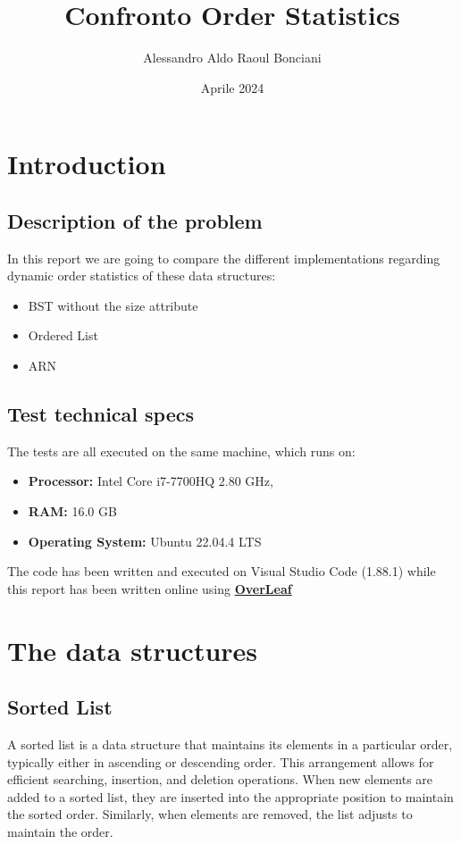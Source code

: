 \documentclass[11pt]{article}
\title{Confronto Order Statistics}
\author{Alessandro Aldo Raoul Bonciani}
\date{Aprile 2024}
\begin{document}

\maketitle
\tableofcontents


\newpage
\section{Introduction}
\subsection{Description of the problem}
In this report we are going to compare the different implementations regarding dynamic order statistics of these data structures:
\begin{itemize}
    \item BST without the size attribute
    \item Ordered List
    \item ARN
\end{itemize}
\subsection{Test technical specs}
The tests are all executed on the same machine, which runs on:\begin{itemize}
    \item \textbf{Processor:} Intel Core i7-7700HQ 2.80 GHz,
    \item \textbf{RAM:} 16.0 GB
    \item \textbf{Operating System:} Ubuntu 22.04.4 LTS
\end{itemize}
The code has been written and executed on Visual Studio Code (1.88.1) while this report has been written online using \textbf{\href{https://overleaf.com}{OverLeaf}}
\section{The data structures}
\subsection{Sorted List}
A sorted list is a data structure that maintains its elements in a particular order, typically either in ascending or descending order. This arrangement allows for efficient searching, insertion, and deletion operations. When new elements are added to a sorted list, they are inserted into the appropriate position to maintain the sorted order. Similarly, when elements are removed, the list adjusts to maintain the order. 
\end{document}
